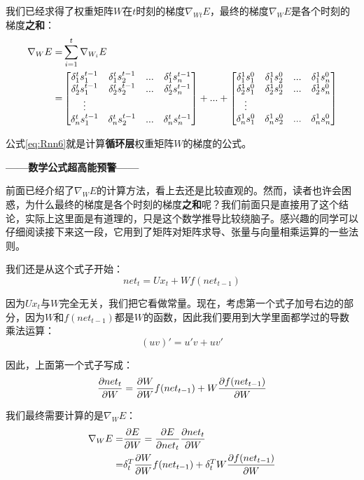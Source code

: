 我们已经求得了权重矩阵$W$在$t$时刻的梯度\(\nabla_{Wt}E\)，最终的梯度\(\nabla_WE\)是各个时刻的梯度\textbf{之和}：
\begin{align}
	\nabla_WE= & \sum_{i=1}^t\nabla_{W_i}E\notag \\
	=          & \begin{bmatrix}
		\delta_1^ts_1^{t-1} & \delta_1^ts_2^{t-1} & ... & \delta_1^ts_n^{t-1} \\
		\delta_2^ts_1^{t-1} & \delta_2^ts_2^{t-1} & ... & \delta_2^ts_n^{t-1} \\
		\vdots                                                                \\
		\delta_n^ts_1^{t-1} & \delta_n^ts_2^{t-1} & ... & \delta_n^ts_n^{t-1} \\
	\end{bmatrix}+...+
	\begin{bmatrix}
		\delta_1^1s_1^0 & \delta_1^1s_2^0 & ... & \delta_1^1s_n^0 \\
		\delta_2^1s_1^0 & \delta_2^1s_2^0 & ... & \delta_2^1s_n^0 \\
		\vdots                                                    \\
		\delta_n^1s_1^0 & \delta_n^1s_2^0 & ... & \delta_n^1s_n^0 \\
	\end{bmatrix}\label{eq:Rnn6}
\end{align}

公式\ref{eq:Rnn6}就是计算\textbf{循环层}权重矩阵$W$的梯度的公式。

\textbf{——数学公式超高能预警——}

前面已经介绍了\(\nabla_WE\)的计算方法，看上去还是比较直观的。然而，读者也许会困惑，为什么最终的梯度是各个时刻的梯度\textbf{之和}呢？我们前面只是直接用了这个结论，实际上这里面是有道理的，只是这个数学推导比较绕脑子。感兴趣的同学可以仔细阅读接下来这一段，它用到了矩阵对矩阵求导、张量与向量相乘运算的一些法则。

我们还是从这个式子开始：
\[
	{net}_t=U{x}_t+Wf({net}_{t-1})
\]

因为\(U{x}_t\)与$W$完全无关，我们把它看做常量。现在，考虑第一个式子加号右边的部分，因为$W$和\(f({net}_{t-1})\)都是$W$的函数，因此我们要用到大学里面都学过的导数乘法运算：
\[
	(uv)'=u'v+uv'
\]

因此，上面第一个式子写成：
\[
	\frac{\partial{{net}_t}}{\partial{W}}=\frac{\partial{W}}{\partial{W}}f({net}_{t-1})+W\frac{\partial{f({net}_{t-1})}}{\partial{W}}\\
\]

我们最终需要计算的是\(\nabla_WE\)：
\begin{align}
	\nabla_WE= & \frac{\partial{E}}{\partial{W}}=\frac{\partial{E}}{\partial{{net}_t}}\frac{\partial{{net}_t}}{\partial{W}}\notag                \\
	=          & \delta_t^T\frac{\partial{W}}{\partial{W}}f({net}_{t-1})+ \delta_t^TW\frac{\partial{f({net}_{t-1})}}{\partial{W}}\label{eq:Rnn7}
\end{align}

